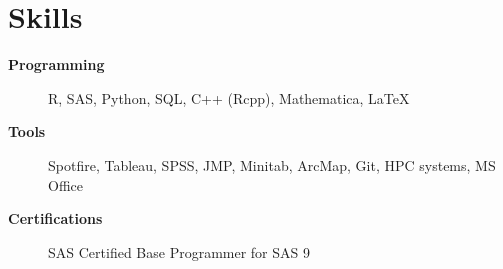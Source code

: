 \section{Skills}

\begin{description}
 \item[\textbf{Programming}] R, SAS, Python, SQL, C++ (Rcpp), Mathematica, \LaTeX
 \item[\textbf{Tools}] Spotfire, Tableau, SPSS, JMP, Minitab, ArcMap, Git, HPC systems, MS Office
 \item[\textbf{Certifications}] SAS Certified Base Programmer for SAS 9 
\end{description}